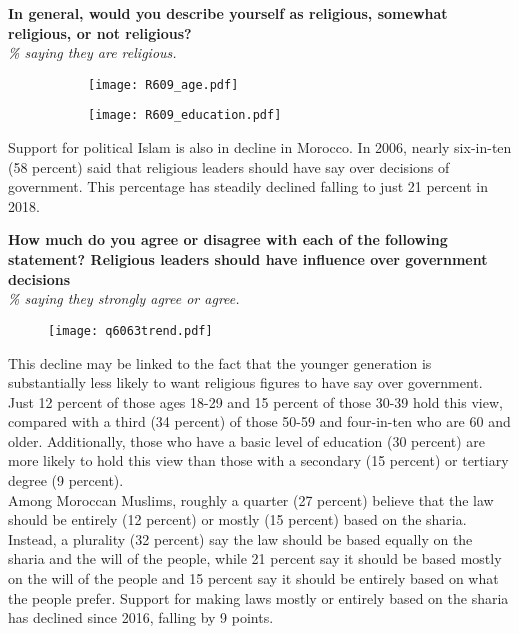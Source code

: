 \documentclass[12pt]{article}
\begin{document}
		\begin{center}
		{\textbf{In general, would you describe yourself as religious, somewhat religious, or not religious?}}\\
		\emph{\% saying they are religious.}
	\end{center}
	\begin{figure}[H]
		\hspace{-1cm}\begin{minipage}{0.5\linewidth}
			\begin{figure}[H]
				\centering
				\texttt{[image: R609\_age.pdf]} 
			\end{figure}
		\end{minipage}
		\begin{minipage}{0.4\linewidth}
			\begin{figure}[H]
				\texttt{[image: R609\_education.pdf]}
			\end{figure}
		\end{minipage}
	\end{figure}

	\noindent Support for political Islam is also in decline in Morocco. In 2006, nearly six-in-ten (58 percent) said that religious leaders should have say over decisions of government. This percentage has steadily declined falling to just 21 percent in 2018.
	
	\pagebreak
		\begin{center}
		{\textbf{How much do you agree or disagree with each of the following statement? Religious leaders should have influence over government decisions}}\\
		\emph{\% saying they strongly agree or agree.}
		\begin{figure}[H]
			\centering
			\texttt{[image: q6063trend.pdf]}
		\end{figure}
	\end{center}
	
	\noindent This decline may be linked to the fact that the younger generation is substantially less likely to want religious figures to have say over government. Just 12 percent of those ages 18-29 and 15 percent of those 30-39 hold this view, compared with a third (34 percent) of those 50-59 and four-in-ten who are 60 and older. Additionally, those who have a basic level of education (30 percent) are more likely to hold this view than those with a secondary (15 percent) or tertiary degree (9 percent).\\
	
	\noindent Among Moroccan Muslims, roughly a quarter (27 percent) believe that the law should be entirely (12 percent) or mostly (15 percent) based on the sharia. Instead, a plurality (32 percent) say the law should be based equally on the sharia and the will of the people, while 21 percent say it should be based mostly on the will of the people and 15 percent say it should be entirely based on what the people prefer. Support for making laws mostly or entirely based on the sharia has declined since 2016, falling by 9 points.\\
	
\end{document}
